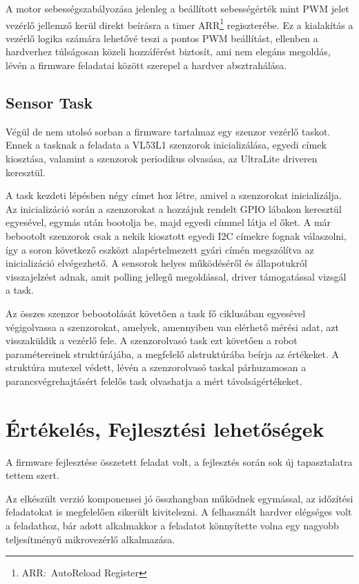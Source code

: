 A motor sebességszabályozása jelenleg a beállított sebességérték mint PWM jelet
vezérlő jellemző kerül direkt beírásra a timer ARR\footnote{ARR:~AutoReload Register}
regiszterébe. Ez a kialakítás a vezérlő logika számára lehetővé teszi a pontos
PWM beállítást, ellenben a hardverhez túlságosan közeli hozzáférést biztosít, ami
nem elegáns megoldás, lévén a firmware feladatai között szerepel a hardver
absztrahálása.

\subsection{Sensor Task}

Végül de nem utolsó sorban a firmware tartalmaz egy szenzor vezérlő taskot. Ennek
a tasknak a feladata a VL53L1 szenzorok inicializálása, egyedi címek kiosztása,
valamint a szenzorok periodikus olvasása, az UltraLite driveren keresztül.

\medskip

A task kezdeti lépésben négy címet hoz létre, amivel a szenzorokat
inicializálja. Az inicializáció során a szenzorokat a hozzájuk rendelt GPIO
lábakon keresztül egyesével, egymás után bootolja be, majd egyedi címmel látja el
őket. A már bebootolt szenzorok csak a nekik kiosztott egyedi I2C címekre fognak
válaszolni, így a soron következő eszközt alapértelmezett gyári címén megszólítva
az inicializáció elvégezhető. A sensorok helyes működéséről és állapotukról
visszajelzést adnak, amit polling jellegű megoldással, driver támogatással
vizsgál a task.

Az összes szenzor bebootolását követően a task fő ciklusában egyesével
végigolvassa a szenzorokat, amelyek, amennyiben van elérhető mérési adat, azt
visszaküldik a vezérlő fele. A szenzorolvasó task ezt követően a robot
paramétereinek struktúrájába, a megfelelő alstruktúrába beírja az értékeket. A
struktúra mutexel védett, lévén a szenzorolvasó taskal párhuzamosan a
parancsvégrehajtásért felelős task olvashatja a mért távolságértékeket. 

\section{Értékelés, Fejlesztési lehetőségek}

A firmware fejlesztése összetett feladat volt, a fejlesztés során sok új
tapasztalatra tettem szert.

\medskip

Az elkészült verzió komponensei jó összhangban működnek egymással, az időzítési
feladatokat is megfelelően sikerült kivitelezni. A felhasznált hardver elégséges
volt a feladathoz, bár adott alkalmakkor a feladatot könnyítette volna egy
nagyobb teljesítményű mikrovezérlő alkalmazása.

